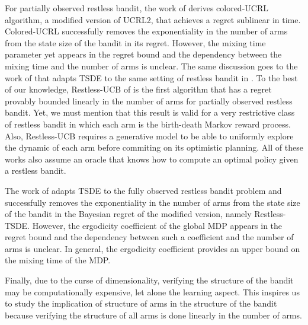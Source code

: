 For partially observed restless bandit, the work of \cite{ortner2012regret} derives colored-UCRL algorithm, a modified version of UCRL2, that achieves a regret sublinear in time.
Colored-UCRL successfully removes the exponentiality in the number of arms from the state size of the bandit in its regret.
However, the mixing time parameter yet appears in the regret bound and the dependency between the mixing time and the number of arms is unclear.
The same discussion goes to the work of \cite{jung2019thompson} that adapts TSDE to the same setting of restless bandit in \cite{ortner2012regret}.
To the best of our knowledge, Restless-UCB of \cite{wang2020restless} is the first algorithm that has a regret provably bounded linearly in the number of arms for partially observed restless bandit.
Yet, we must mention that this result is valid for a very restrictive class of restless bandit in which each arm is the birth-death Markov reward process.
Also, Restless-UCB requires a generative model to be able to uniformly explore the dynamic of each arm before commiting on its optimistic planning.
All of these works also assume an oracle that knows how to compute an optimal policy given a restless bandit.

The work of \cite{akbarzadeh2022learning} adapts TSDE to the fully observed restless bandit problem and successfully removes the exponentiality in the number of arms from the state size of the bandit in the Bayesian regret of the modified version, namely Restless-TSDE.
However, the ergodicity coefficient of the global MDP appears in the regret bound and the dependency between such a coefficient and the number of arms is unclear.
In general, the ergodicity coefficient provides an upper bound on the mixing time of the MDP.

Finally, due to the curse of dimensionality, verifying the structure of the bandit may be computationally expensive, let alone the learning aspect.
This inspires us to study the implication of structure of arms in the structure of the bandit because verifying the structure of all arms is done linearly in the number of arms.





